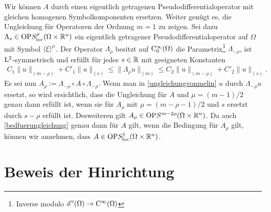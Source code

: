 Wir können $A$ durch einen eigentlich getragenen Pseudodifferentialoperator mit gleichen homogenen Symbolkomponenten ersetzen.  Weiter genügt es, die Ungleichung für Operatoren der Ordnung $m=1$ zu zeigen. Sei dazu $\Lambda_s\in\mathrm{OP}S^\rho_{\rm loc}(\Omega\times\mathbb R^n)$ ein eigentlich getragener Pseudodifferentialoperator auf $\Omega$ mit Symbol $\braket\xi^\rho$.
Der Operator $\Lambda_\rho$ besitzt auf $\mathrm C_0^\infty(\Omega)$ die Parametrix\footnote{Inverse modulo $\mathscr E'(\Omega)\to\mathrm C^\infty(\Omega)$}  $\Lambda_{-\rho}$, ist $\mathrm L^2$-symmetrisch und erfüllt für jedes $s\in\mathbb R$ mit geeigneten Konstanten
\begin{align}
   C_1 \|u\|_{(m-\rho)} + C'_1 \|u\|_{(s)} \le    \|\Lambda_\rho u\|_{(m)} \le   C_2 \|u\|_{(m-\rho)} + C'_2 \|u\|_{(s)}.
\end{align}
Es sei nun $A_\rho:=\Lambda_{-\rho} \circ A\circ\Lambda_{-\rho}$. Wenn man in \eqref{ungleichungvonmelin} $u$ durch $\Lambda_{-\rho} u$ ersetzt, so wird ersichtlich, dass die Ungleichung für $A$ und $\mu=(m-1)/2$ genau dann erfüllt ist, wenn sie für $A_\rho$ mit $\mu=(m-\rho-1)/2$ und $s$ ersetzt durch $s-\rho$ erfüllt ist. Desweiteren gilt $A_\rho\in \mathrm{OP}S^{m-2\rho}(\Omega\times\mathbb R^n)$. 
Da auch \eqref{bedfuerungleichung} genau dann für $A$ gilt, wenn die Bedingung für $A_\rho$ gilt, können wir annehmen, dass $A\in\mathrm{OP}S^1_{\rm loc}(\Omega\times\mathbb R^n)$.


\section{Beweis der Hinrichtung}

